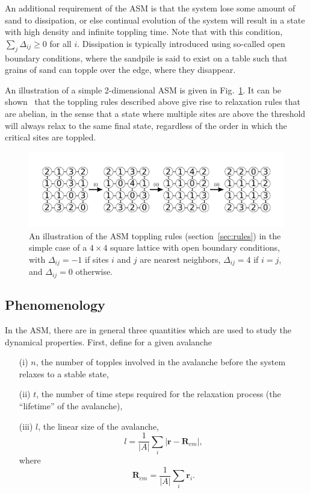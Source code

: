 \documentclass[aps,prb,reprint,superscriptaddress]{revtex4-2}
\begin{document}
An additional requirement of the ASM is that the system lose some amount of sand to dissipation, or else continual evolution of the system will result in a state with high density and infinite toppling time. Note that with this condition, $\sum_j\Delta_{ij} \geq 0$ for all $i$. Dissipation is typically introduced using so-called open boundary conditions, where the sandpile is said to exist on a table such that grains of sand can topple over the edge, where they disappear.

An illustration of a simple 2-dimensional ASM is given in Fig.~\ref{fig:rules}. It can be shown~\cite{dhar_self-organized_1990} that the toppling rules described above give rise to relaxation rules that are abelian, in the sense that a state where multiple sites are above the threshold will always relax to the same final state, regardless of the order in which the critical sites are toppled.

\begin{figure}
\includegraphics{rules}
\caption{\label{fig:rules} An illustration of the ASM toppling rules (section~\ref{sec:rules}) in the simple case of a $4 \times 4$ square lattice with open boundary conditions, with $\Delta_{ij} = -1$ if sites $i$ and $j$ are nearest neighbors, $\Delta_{ij} = 4$ if $i = j$, and $\Delta_{ij} = 0$ otherwise.}
\end{figure}

\subsection{Phenomenology\label{sec:phenomenology}}

In the ASM, there are in general three quantities which are used to study the dynamical properties. First, define for a given avalanche

\begin{enumerate}
\item[(i)] $n$, the number of topples involved in the avalanche before the system relaxes to a stable state,
\item[(ii)] $t$, the number of time steps required for the relaxation process (the ``lifetime'' of the avalanche),
\item[(iii)] $l$, the linear size of the avalanche, 
\[
l = \dfrac{1}{|A|}\sum_i|\bm{r}-\bm{R}_{cm}|,
\]
where
\[
\bm{R}_{cm} = \dfrac{1}{|A|}\sum_i\bm{r}_i.
\]
\end{enumerate}
\end{document}
